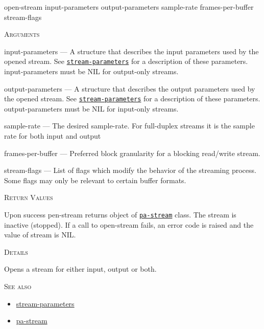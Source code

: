\documentclass[a4paper]{report}
\begin{document}
    \label{portaudio__fun__open-stream}
    \begin{defun}[Function]
    open-stream input-parameters output-parameters sample-rate frames-per-buffer stream-flags


    
    \bigskip
    \textsc{Arguments}

input-parameters
	--- A structure that describes the input parameters used by the opened stream. See \hyperref[portaudio__class__stream-parameters]{\texttt{stream-parameters}}
   for a description of these parameters. input-parameters must be NIL for output-only streams.

output-parameters
	--- A structure that describes the output parameters used by the opened stream. See \hyperref[portaudio__class__stream-parameters]{\texttt{stream-parameters}}
   for a description of these parameters. output-parameters must be NIL for input-only streams.

sample-rate
	--- The desired sample-rate. For full-duplex streams it is the sample rate for both input and output

frames-per-buffer
	--- Preferred block granularity for a blocking read/write stream.

stream-flags
	--- List of flags which modify the behavior of the streaming process. Some flags may only be relevant to certain buffer formats.




    
    \bigskip
    \textsc{Return Values}

Upon success pen-stream returns object of \hyperref[portaudio__class__pa-stream]{\texttt{pa-stream}}
   class. The stream is inactive (stopped). If a call to open-stream fails, an error code is raised and the value of stream is NIL.


	
    \bigskip
    \textsc{Details}


Opens a stream for either input, output or both.






      
    \bigskip
    \textsc{See also}


	
    \begin{itemize}
    
	  
    \item
    \hyperref[portaudio__class__stream-parameters]{stream-parameters}
    
    \item
    \hyperref[portaudio__class__pa-stream]{pa-stream}
    
	
    \end{itemize}
  
      


    
    \end{defun}
  
\end{document}
